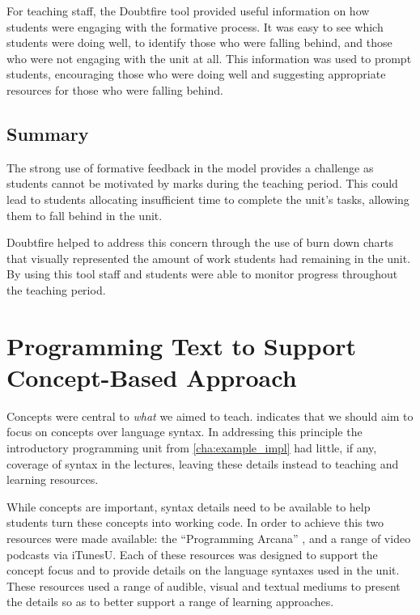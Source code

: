 For teaching staff, the Doubtfire tool provided useful information on how students were engaging with the formative process. It was easy to see which students were doing well, to identify those who were falling behind, and those who were not engaging with the unit at all. This information was used to prompt students, encouraging those who were doing well and suggesting appropriate resources for those who were falling behind.

\subsection{Summary} %
\label{sub:doubtfire_summary}

The strong use of formative feedback in the model provides a challenge as students cannot be motivated by marks during the teaching period. This could lead to students allocating insufficient time to complete the unit's tasks, allowing them to fall behind in the unit.

Doubtfire helped to address this concern through the use of burn down charts that visually represented the amount of work students had remaining in the unit. By using this tool staff and students were able to monitor progress throughout the teaching period.



\section{Programming Text to Support Concept-Based Approach} %
\label{sec:arcana}

Concepts were central to \emph{what} we aimed to teach.  indicates that we should aim to focus on concepts over language syntax. In addressing this principle the introductory programming unit from \cref{cha:example_impl} had little, if any, coverage of syntax in the lectures, leaving these details instead to teaching and learning resources.

While concepts are important, syntax details need to be available to help students turn these concepts into working code. In order to achieve this two resources were made available: the ``Programming Arcana'' \cite{Cain:2013arcana}, and a range of video podcasts via iTunesU. Each of these resources was designed to support the concept focus and to provide details on the language syntaxes used in the unit. These resources used a range of audible, visual and textual mediums to present the details so as to better support a range of learning approaches.

